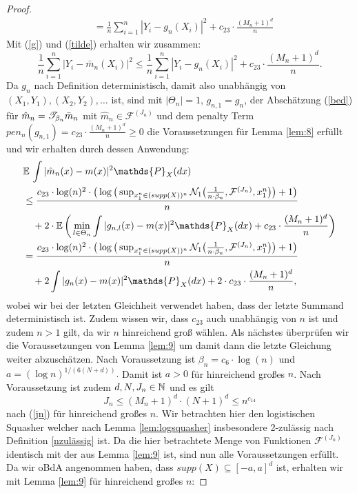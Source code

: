 \begin{proof}
\begin{equation}
\begin{split}
& = \frac{1}{n} \sum_{i = 1}^n|Y_i - g_n(X_i)|^2 + c_{23} \cdot \frac{(M_n + 1)^d}{n}
\end{split}
\end{equation}
Mit (\ref{g}) und (\ref{tilde}) erhalten wir zusammen$\colon$
\begin{equation}
\label{bed}
\frac{1}{n} \sum_{i = 1}^n|Y_i - \bar{m}_n(X_i)|^2 \leq \frac{1}{n} \sum_{i = 1}^n|Y_i - g_n(X_i)|^2 + c_{23} \cdot \frac{(M_n + 1)^d}{n}.
\end{equation}
Da $g_n$ nach Definition deterministisch, damit also unabhängig von $(X_1, Y_1), (X_2, Y_2),\dots$ ist, sind mit $|\Theta_n| = 1$, $g_{n,1} = g_n$, der Abschätzung (\ref{bed}) für $\hat{m}_n = \mathscr{T}_{\beta_n}\bar{m}_n$ mit $\hat{m}_n \in \mathcal{F}^{(J_n)}$ und dem penalty Term $pen_n(g_{n,1}) = c_{23} \cdot \frac{(M_n + 1)^d}{n} \geq 0$ die Voraussetzungen für Lemma \ref{lem:8} erfüllt und wir erhalten durch dessen Anwendung:
\begin{equation*}
\begin{split}
& \E \int |\hat{m}_n(x) - m(x)|^2 \mathds{P}_X(dx) \\
& \leq \frac{c_{23} \cdot \log(n)^2 \cdot \big(\log\big(\sup_{x_1^n \in (supp(X))^n}\mathcal{N}_1\big(\frac{1}{n \cdot \beta_n},\mathcal{F}^{(J_n)},x_1^n\big)\big) + 1\big)}{n} \\
& \quad + 2 \cdot \E\bigg(\min_{l \in \Theta_n} \int |g_{n,l}(x) - m(x)|^2 \mathds{P}_X(dx) + c_{23} \cdot \frac{(M_n + 1)^d}{n}\bigg) \\
& = \frac{c_{23} \cdot \log(n)^2 \cdot \big(\log\big(\sup_{x_1^n \in (supp(X))^n}\mathcal{N}_1\big(\frac{1}{n \cdot \beta_n},\mathcal{F}^{(J_n)},x_1^n\big)\big) + 1\big)}{n} \\
& \quad + 2 \int |g_{n}(x) - m(x)|^2 \mathds{P}_X(dx) + 2 \cdot c_{23} \cdot \frac{(M_n + 1)^d}{n},
\end{split}
\end{equation*}
wobei wir bei der letzten Gleichheit verwendet haben, dass der letzte Summand deterministisch ist. Zudem wissen wir, dass $c_{23}$ auch unabhängig von $n$ ist und zudem $n > 1$ gilt, da wir $n$ hinreichend groß wählen.
Als nächstes überprüfen wir die Voraussetzungen von Lemma \ref{lem:9} um damit dann die letzte Gleichung weiter abzuschätzen.
Nach Voraussetzung ist $\beta_n = c_6 \cdot \log(n)$ und $a = (\log n)^{1/(6(N + d))}.$ Damit ist $a > 0$ für hinreichend großes $n$. Nach Voraussetzung ist zudem $d, N, J_n \in \mathbb{N}$ und es gilt
$$J_n \leq (M_n + 1)^d \cdot (N + 1)^d \leq n^{c_{14}}$$
 nach (\ref{jn}) für hinreichend großes $n$. Wir betrachten hier den logistischen Squasher welcher nach Lemma \ref{lem:logsquasher} insbesondere 2-zulässig nach Definition \ref{nzulässig} ist. Da die hier betrachtete Menge von Funktionen $\mathcal{F}^{(J_n)}$ identisch mit der aus Lemma \ref{lem:9} ist, sind nun alle Voraussetzungen erfüllt. Da wir oBdA angenommen haben, dass $supp(X) \subseteq [-a, a]^d$ ist, erhalten wir mit Lemma \ref{lem:9} für hinreichend großes $n$:

\end{proof}
